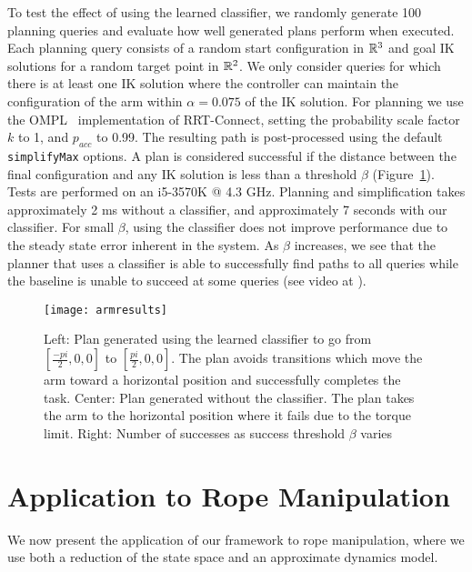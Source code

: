 To test the effect of using the learned classifier, we randomly generate 100 planning queries and evaluate how well generated plans perform when executed. Each planning query consists of a random start configuration in $\mathbb{R}^3$ and goal IK solutions for a random target point in $\mathbb{R}^2$. We only consider queries for which there is at least one IK solution where the controller can maintain the configuration of the arm within $\alpha = 0.075$ of the IK solution. For planning we use the OMPL~\cite{ompl} implementation of RRT-Connect, setting the probability scale factor $k$ to 1, and $p_{acc}$ to 0.99. The resulting path is post-processed using the default \texttt{simplifyMax} options. A plan is considered successful if the distance between the final configuration and any IK solution is less than a threshold $\beta$ (Figure~\ref{fig:planar_arm}). Tests are performed on an i5-3570K @ 4.3 GHz. Planning and simplification takes approximately 2 ms without a classifier, and approximately 7 seconds with our classifier. For small $\beta$, using the classifier does not improve performance due to the steady state error inherent in the system. As $\beta$ increases, we see that the planner that uses a classifier is able to successfully find paths to all queries while the baseline is unable to succeed at some queries (see video at \ralurl).

\begin{figure}[h]
    \centering
    \texttt{[image: armresults]}
    \caption{Left: Plan generated using the learned classifier to go from $[\frac{-pi}{2}, 0, 0]$ to $[\frac{pi}{2}, 0, 0]$. The plan avoids transitions which move the arm toward a horizontal position and successfully completes the task. Center: Plan generated without the classifier. The plan takes the arm to the horizontal position where it fails due to the torque limit. Right: Number of successes as success threshold $\beta$ varies}
    \label{fig:planar_arm}
\end{figure}


\section{Application to Rope Manipulation}

We now present the application of our framework to rope manipulation, where we use both a reduction of the state space and an approximate dynamics model.

